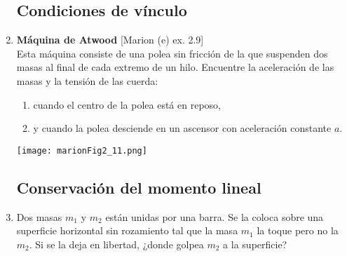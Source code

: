\documentclass[11pt,spanish,a4paper]{article}
\begin{document}
\begin{enumerate}
\subsection*{Condiciones de vínculo}
\item
\begin{minipage}[t][4cm]{0.4\textwidth}
\textbf{Máquina de Atwood} [Marion (e) ex. 2.9]\\
Esta máquina consiste de una polea sin fricción de la que suspenden dos masas al final de cada extremo de un hilo.
Encuentre la aceleración de las masas y la tensión de las cuerda:
  \begin{enumerate}
	\item cuando el centro de la polea está en reposo,
	\item y cuando la polea desciende en un ascensor con aceleración constante \(a\).
  \end{enumerate}
\end{minipage}
\begin{minipage}[c][0cm][t]{0.55\textwidth}
	\texttt{[image: marionFig2\_11.png]}
\end{minipage}

%
%

\vspace{1cm}
\subsection*{Conservación del momento lineal}

\item Dos masas \(m_1\) y \(m_2\) están unidas por una barra.
Se la coloca sobre una superficie horizontal sin rozamiento tal que la masa \(m_1\) la toque pero no la \(m_2\). 
Si se la deja en libertad, ¿donde golpea \(m_2\) a la superficie?




\end{enumerate}
\end{document}
